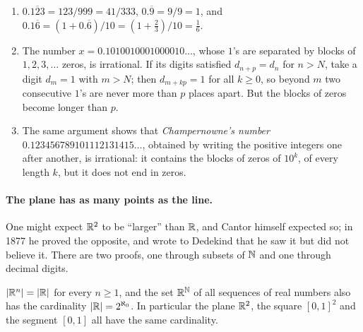 \begin{example}\label{number-systems:example-irrational-decimals}
\begin{enumerate}
\item $0.\overline{123} = 123/999 = 41/333$, $0.\overline{9} = 9/9 = 1$, and $0.1\overline{6} = (1 + 0.\overline{6})/10 = (1 + \frac23)/10 = \frac16$.
\item The number $x = 0.1010010001000010\ldots$, whose $1$'s are separated by blocks of $1, 2, 3, \ldots$ zeros, is irrational. If its digits satisfied $d_{n+p} = d_n$ for $n > N$, take a digit $d_m = 1$ with $m > N$;
then $d_{m+kp} = 1$ for all $k \geq 0$, so beyond $m$ two consecutive $1$'s are never more than $p$ places apart. But the blocks of zeros become longer than $p$.
\item The same argument shows that \emph{Champernowne's number} $0.123456789101112131415\ldots$, obtained by writing the positive integers one after another, is irrational: it contains the blocks of zeros of
$10^k$, of every length $k$, but it does not end in zeros.
\end{enumerate}
\end{example}

\paragraph{The plane has as many points as the line.} One might expect $\mathbb{R}^2$ to be ``larger'' than $\mathbb{R}$, and Cantor himself expected so; in 1877 he proved the opposite, and wrote to Dedekind that he saw it but did not
believe it. There are two proofs, one through subsets of $\mathbb{N}$ and one through decimal digits.

\begin{proposition}\label{number-systems:proposition-plane-cardinality}
$|\mathbb{R}^n| = |\mathbb{R}|$ for every $n \geq 1$, and the set $\mathbb{R}^{\mathbb{N}}$ of all sequences of real numbers also has the cardinality $|\mathbb{R}| = 2^{\aleph_0}$. In particular the plane $\mathbb{R}^2$, the square $[0, 1]^2$ and
the segment $[0, 1]$ all have the same cardinality.
\end{proposition}

